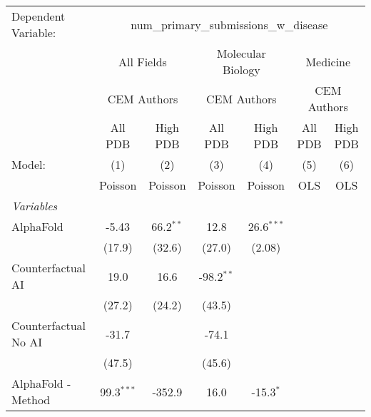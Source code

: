 \begingroup
\centering
\begin{tabular}{lcccccc}
   \tabularnewline \midrule \midrule
   Dependent Variable: & \multicolumn{6}{c}{num\_primary\_submissions\_w\_disease}\\
 & \multicolumn{2}{c}{All Fields} & \multicolumn{2}{c}{Molecular Biology} & \multicolumn{2}{c}{Medicine} \\
\cmidrule(lr){2-3} \cmidrule(lr){4-5} \cmidrule(lr){6-7}
 & \multicolumn{2}{c}{CEM Authors} & \multicolumn{2}{c}{CEM Authors} & \multicolumn{2}{c}{CEM Authors} \\
\cmidrule(lr){2-3} \cmidrule(lr){4-5} \cmidrule(lr){6-7}
 & \multicolumn{1}{c}{All PDB} & \multicolumn{1}{c}{High PDB} & \multicolumn{1}{c}{All PDB} & \multicolumn{1}{c}{High PDB} & \multicolumn{1}{c}{All PDB} & \multicolumn{1}{c}{High PDB} \\
\cmidrule(lr){2-2} \cmidrule(lr){3-3} \cmidrule(lr){4-4} \cmidrule(lr){5-5} \cmidrule(lr){6-6} \cmidrule(lr){7-7}
   Model:                                                     & (1)          & (2)         & (3)            & (4)          & (5)  & (6)\\  
                                                              &  Poisson     & Poisson     & Poisson        & Poisson      & OLS  & OLS\\  
   \midrule
   \emph{Variables}\\
   AlphaFold                                                  & -5.43        & 66.2$^{**}$ & 12.8           & 26.6$^{***}$ &      &   \\   
                                                              & (17.9)       & (32.6)      & (27.0)         & (2.08)       &      &   \\   
   Counterfactual AI                                          & 19.0         & 16.6        & -98.2$^{**}$   &              &      &   \\   
                                                              & (27.2)       & (24.2)      & (43.5)         &              &      &   \\   
   Counterfactual No AI                                       & -31.7        &             & -74.1          &              &      &   \\   
                                                              & (47.5)       &             & (45.6)         &              &      &   \\   
   AlphaFold - Method                                         & 99.3$^{***}$ & -352.9      & 16.0           & -15.3$^{*}$  &      &   \\   

\end{tabular}
